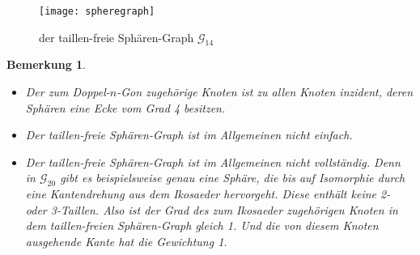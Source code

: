 \documentclass[12pt,titlepage,twoside,cleardoublepage]{article}
\theoremstyle{nummermitklammern}
\newtheorem{bemerkung}[temp]{Bemerkung}
\newtheorem{bemerkung}[zahl]{Bemerkung}
\numberwithin{equation}{section}
\begin{document}
 \begin{figure}[H]
\begin{center}
\texttt{[image: spheregraph]}
\end{center}
\caption{der taillen-freie Sphären-Graph $\mathcal{G}_{14}$}
\end{figure}
 \begin{bemerkung}
 \begin{itemize}
 \item Der zum Doppel-$n$-Gon zugehörige Knoten ist zu allen Knoten inzident, deren Sphären eine Ecke vom Grad 4 besitzen.
 \item Der taillen-freie Sphären-Graph ist im Allgemeinen nicht einfach.
 \item Der taillen-freie Sphären-Graph ist im Allgemeinen nicht vollständig. Denn in $\mathcal{G}_{20}$ gibt es beispielsweise genau eine Sphäre, die bis auf Isomorphie durch eine Kantendrehung aus dem Ikosaeder hervorgeht. Diese enthält keine 2- oder 3-Taillen. Also ist der Grad des zum Ikosaeder zugehörigen Knoten in dem taillen-freien Sphären-Graph gleich 1. Und die von diesem Knoten ausgehende Kante hat die Gewichtung 1.
 \end{itemize}
 \end{bemerkung}
\end{document}
